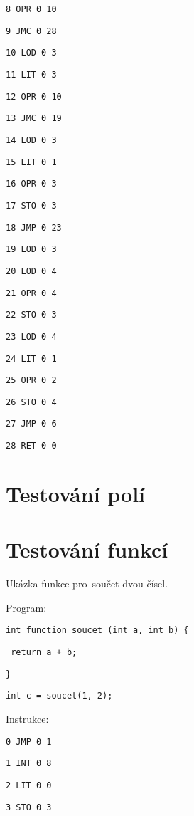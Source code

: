 \documentclass[czech]{thesiskiv}
\begin{document}
\texttt{8	OPR	0	10      }

\texttt{9	JMC	0	28       }

\texttt{10	LOD	0	3       }

\texttt{11	LIT	0	3        }

\texttt{12	OPR	0	10        }

\texttt{13	JMC	0	19         }

\texttt{14	LOD	0	3           }

\texttt{15	LIT	0	1 }

\texttt{16	OPR	0	3  }

\texttt{17	STO	0	3   }

\texttt{18	JMP	0	23   }

\texttt{19	LOD	0	3     }

\texttt{20	LOD	0	4      }

\texttt{21	OPR	0	4       }

\texttt{22	STO	0	3        }

\texttt{23	LOD	0	4         }

\texttt{24	LIT	0	1          }

\texttt{25	OPR	0	2           }

\texttt{26	STO	0	4            }

\texttt{27	JMP	0	6             }

\texttt{28	RET	0	0              }


\section{Testování polí}

\section{Testování funkcí}
Ukázka funkce pro~součet dvou čísel.

\noindent Program:

\texttt{int function soucet (int a, int b) \{}
 
\texttt{    return a + b;}

\texttt{\} }

\texttt{int c = soucet(1, 2); }

\noindent Instrukce: 

\texttt{0	JMP	0	1              }

\texttt{1	INT	0	8              }

\texttt{2	LIT	0	0             }

\texttt{3	STO	0	3            }
\end{document}
